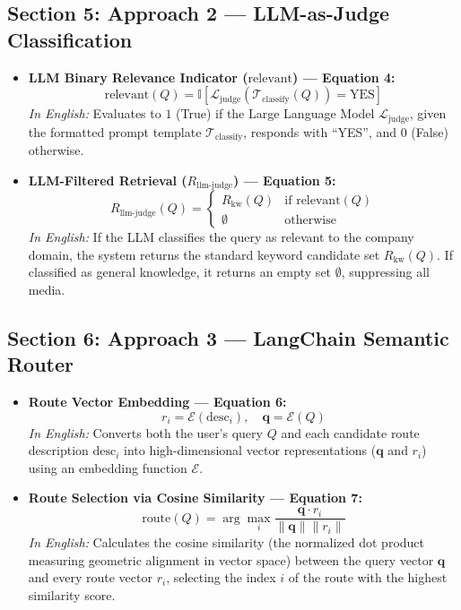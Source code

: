 \documentclass{article}
\begin{document}
\subsection{Section 5: Approach 2 --- LLM-as-Judge Classification}
\begin{itemize}
    \item \textbf{LLM Binary Relevance Indicator ($\text{relevant}$) --- Equation 4:}
    $$\text{relevant}(Q) = \mathbb{I}\left[\mathcal{L}_{\text{judge}}(\mathcal{T}_{\text{classify}}(Q)) = \text{YES}\right]$$
    \textit{In English:} Evaluates to $1$ (True) if the Large Language Model $\mathcal{L}_{\text{judge}}$, given the formatted prompt template $\mathcal{T}_{\text{classify}}$, responds with ``YES'', and $0$ (False) otherwise.

    \item \textbf{LLM-Filtered Retrieval ($R_{\text{llm-judge}}$) --- Equation 5:}
    $$R_{\text{llm-judge}}(Q) = \begin{cases} R_{\text{kw}}(Q) & \text{if } \text{relevant}(Q) \\ \emptyset & \text{otherwise} \end{cases}$$
    \textit{In English:} If the LLM classifies the query as relevant to the company domain, the system returns the standard keyword candidate set $R_{\text{kw}}(Q)$. If classified as general knowledge, it returns an empty set $\emptyset$, suppressing all media.
\end{itemize}

\subsection{Section 6: Approach 3 --- LangChain Semantic Router}
\begin{itemize}
    \item \textbf{Route Vector Embedding --- Equation 6:}
    $$r_i = \mathcal{E}(\text{desc}_i), \quad \mathbf{q} = \mathcal{E}(Q)$$
    \textit{In English:} Converts both the user's query $Q$ and each candidate route description $\text{desc}_i$ into high-dimensional vector representations ($\mathbf{q}$ and $r_i$) using an embedding function $\mathcal{E}$.

    \item \textbf{Route Selection via Cosine Similarity --- Equation 7:}
    $$\text{route}(Q) = \arg\max_i \frac{\mathbf{q} \cdot r_i}{\|\mathbf{q}\| \|r_i\|}$$
    \textit{In English:} Calculates the cosine similarity (the normalized dot product measuring geometric alignment in vector space) between the query vector $\mathbf{q}$ and every route vector $r_i$, selecting the index $i$ of the route with the highest similarity score.
\end{itemize}
\end{document}
